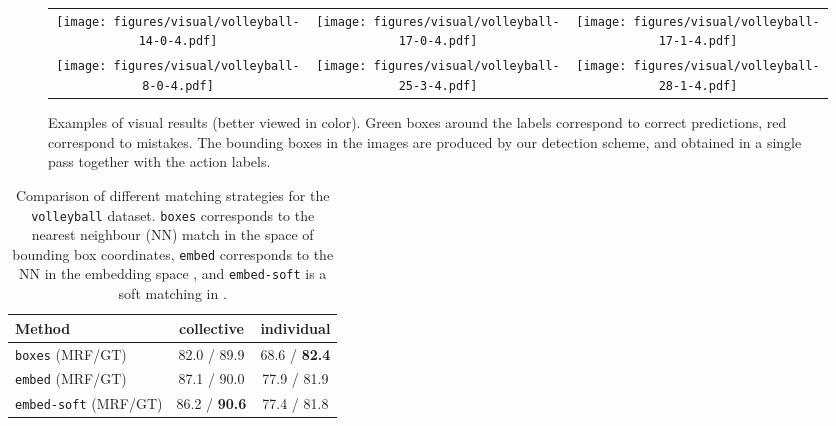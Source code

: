 \documentclass[10pt,twocolumn,letterpaper]{article}
\begin{document}
\renewcommand{\tabcolsep}{1pt}
\begin{figure*}[htp!]
\begin{center}
\begin{tabular}{ccc}
\texttt{[image: figures/visual/volleyball-14-0-4.pdf]} &
\texttt{[image: figures/visual/volleyball-17-0-4.pdf]} &
\texttt{[image: figures/visual/volleyball-17-1-4.pdf]} \\
\texttt{[image: figures/visual/volleyball-8-0-4.pdf]} &
\texttt{[image: figures/visual/volleyball-25-3-4.pdf]} &
\texttt{[image: figures/visual/volleyball-28-1-4.pdf]} \\
\end{tabular}
\end{center}
\caption{Examples of visual results (better viewed in color). 
Green boxes around the labels correspond to correct predictions, red correspond to 
mistakes. The bounding boxes in the images are produced by our detection scheme, 
and obtained in a single pass together with the action labels.}
\label{fi:eval:visual}
\vspace{-0.25cm}
\end{figure*}
\renewcommand{\tabcolsep}{6pt}





\begin{table}[ht!]
  \begin{center}
    \begin{tabular}{|l|c|c|}
      \hline
      Method  & collective & individual \\\hline
      \texttt{boxes} (MRF/GT) & 82.0 / 89.9  & 68.6 / \textbf{82.4}  \\
      \texttt{embed} (MRF/GT) & 87.1 / 90.0   & 77.9 / 81.9  \\
\texttt{embed-soft} (MRF/GT) &  86.2 / \textbf{90.6}  & 77.4 / 81.8  \\\hline 
    \end{tabular}
  \end{center}
  \caption{Comparison of different matching strategies for the
    \texttt{volleyball} dataset. \texttt{boxes}
    corresponds  to the nearest neighbour (NN) match in the space of bounding
    box coordinates, \texttt{embed} corresponds to the NN in the embedding space
    , and \texttt{embed-soft} is a soft matching in .}
  \label{tab:eval:volley-matching}
  \vspace{-0.25cm}
\end{table}
\end{document}
